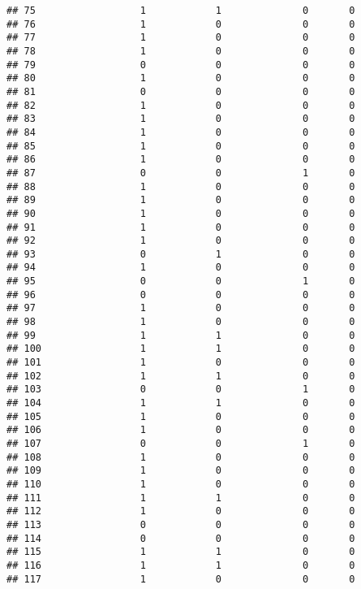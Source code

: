 \documentclass[]{article}
\begin{document}
\begin{verbatim}
## 75                  1            1              0       0
## 76                  1            0              0       0
## 77                  1            0              0       0
## 78                  1            0              0       0
## 79                  0            0              0       0
## 80                  1            0              0       0
## 81                  0            0              0       0
## 82                  1            0              0       0
## 83                  1            0              0       0
## 84                  1            0              0       0
## 85                  1            0              0       0
## 86                  1            0              0       0
## 87                  0            0              1       0
## 88                  1            0              0       0
## 89                  1            0              0       0
## 90                  1            0              0       0
## 91                  1            0              0       0
## 92                  1            0              0       0
## 93                  0            1              0       0
## 94                  1            0              0       0
## 95                  0            0              1       0
## 96                  0            0              0       0
## 97                  1            0              0       0
## 98                  1            0              0       0
## 99                  1            1              0       0
## 100                 1            1              0       0
## 101                 1            0              0       0
## 102                 1            1              0       0
## 103                 0            0              1       0
## 104                 1            1              0       0
## 105                 1            0              0       0
## 106                 1            0              0       0
## 107                 0            0              1       0
## 108                 1            0              0       0
## 109                 1            0              0       0
## 110                 1            0              0       0
## 111                 1            1              0       0
## 112                 1            0              0       0
## 113                 0            0              0       0
## 114                 0            0              0       0
## 115                 1            1              0       0
## 116                 1            1              0       0
## 117                 1            0              0       0

\end{verbatim}
\end{document}
